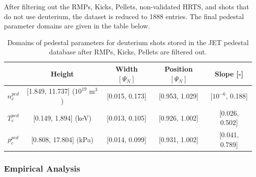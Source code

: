 \documentclass[a4paper, twoside, final, 12pt]{article}
\begin{document}
After filtering out the RMPs, Kicks, Pellets, non-validated HRTS, and shots that do not use deuterium, the dataset is reduced to 1888 entries. The final pedestal parameter domains are given in the table below.
\begin{center}
\begin{table}
\begin{tabular}{ | c | c | c | c | c | }	
	\hline 
	& Height & Width $[\Psi_N]$ & Position $[\Psi_N]$ & Slope [-] \\ 
	\hline
	$n_e^{ped}$ &[1.849, 11.737] ($10^{19}$ m$^3$) & [0.015, 0.173]& [0.953, 1.029] & [$10^{-6}$, 0.188] \\
	$T_e^{ped}$ & [0.149, 1.894] (keV)& [0.013, 0.105] & [0.926, 1.002] & [0.026, 0.502] \\
	$p_e^{ped}$ & [0.808, 17.804] (kPa)& [0.014, 0.099] & [0.931, 1.002]& [0.041, 0.789] \\
	\hline

	
\end{tabular}
\label{tab:ped_quant}
\caption{Domains of pedestal parameters for deuterium shots stored in the JET pedestal database after RMPs, Kicks, Pellets are filtered out.}
\end{table}
\end{center}


\subsubsection{Empirical Analysis}
\end{document}
